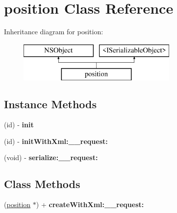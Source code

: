 \hypertarget{interfaceposition}{}\section{position Class Reference}
\label{interfaceposition}
Inheritance diagram for position\+:\begin{figure}[H]
\begin{center}
\leavevmode
\includegraphics[height=2.000000cm]{interfaceposition}
\end{center}
\end{figure}
\subsection*{Instance Methods}
\begin{DoxyCompactItemize}
\item 
\hypertarget{interfaceposition_a8abf4d38b0726c92e517238d599ff71b}{}(id) -\/ {\bfseries init}\label{interfaceposition_a8abf4d38b0726c92e517238d599ff71b}

\item 
\hypertarget{interfaceposition_a021d37b31a1cc99a27a4a574467ea380}{}(id) -\/ {\bfseries init\+With\+Xml\+:\+\_\+\+\_\+request\+:}\label{interfaceposition_a021d37b31a1cc99a27a4a574467ea380}

\item 
\hypertarget{interfaceposition_acd19abd3f954e9403e8ca1067b4af9ea}{}(void) -\/ {\bfseries serialize\+:\+\_\+\+\_\+request\+:}\label{interfaceposition_acd19abd3f954e9403e8ca1067b4af9ea}

\end{DoxyCompactItemize}
\subsection*{Class Methods}
\begin{DoxyCompactItemize}
\item 
\hypertarget{interfaceposition_a3e7f776cc88fd26c9c9e26bab8563cd7}{}(\hyperlink{interfaceposition}{position} $\ast$) + {\bfseries create\+With\+Xml\+:\+\_\+\+\_\+request\+:}\label{interfaceposition_a3e7f776cc88fd26c9c9e26bab8563cd7}

\end{DoxyCompactItemize}
